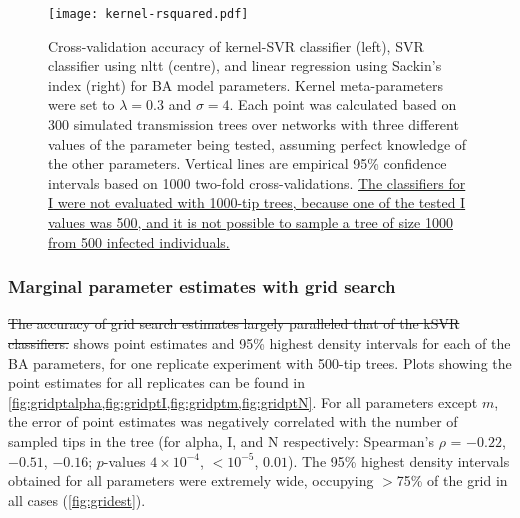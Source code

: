 \begin{figure}[ht]
  \centering
  \texttt{[image: kernel-rsquared.pdf]}
  \caption[Cross-validation accuracy of kernel-SVR, nLTT-based SVR, and
  Sackin's index regression classifiers for BA model parameters.]{
      Cross-validation accuracy of kernel-SVR classifier (left), SVR classifier
      using \gls{nltt} (centre), and linear regression using Sackin's index
      (right) for \gls{BA} model parameters. Kernel meta-parameters were set to
      $\lambda = 0.3$ and $\sigma = 4$. Each point was calculated based on 300
      simulated transmission trees over networks with three different values of
      the parameter being tested, assuming perfect knowledge of the other
      parameters. Vertical lines are empirical 95\% confidence intervals based
      on 1000 two-fold cross-validations. {\color{blue}\uline{ The classifiers
      for \gls{I} were not evaluated with 1000-tip trees, because one of the
      tested \gls{I} values was 500, and it is not possible to sample a tree of
      size 1000 from 500 infected individuals.}}
  }
  \label{fig:rsquared}
\end{figure}

\subsubsection*{Marginal parameter estimates with grid search}



{\color{red}\sout{The accuracy of grid search estimates largely paralleled that
of the \gls{kSVR} classifiers.}} shows point estimates and
95\% highest density intervals for each of the \gls{BA} parameters, for one
replicate experiment with 500-tip trees. Plots showing the point estimates for
all replicates can be found in
\cref{fig:gridptalpha,fig:gridptI,fig:gridptm,fig:gridptN}. For all parameters
except $m$, the error of point estimates was negatively correlated with the
number of sampled tips in the tree (for \gls{alpha}, \gls{I}, and \gls{N}
respectively: Spearman's $\rho$ = \ensuremath{-0.22},
\ensuremath{-0.51}, \ensuremath{-0.16}; $p$-values
    $4\!\times\!10^{-4}$,
    ${<}10^{-5}$,
    $0.01$).
The 95\% highest density intervals obtained for all parameters were extremely
wide, occupying $>$75\% of the grid in all cases (\cref{fig:gridest}).


